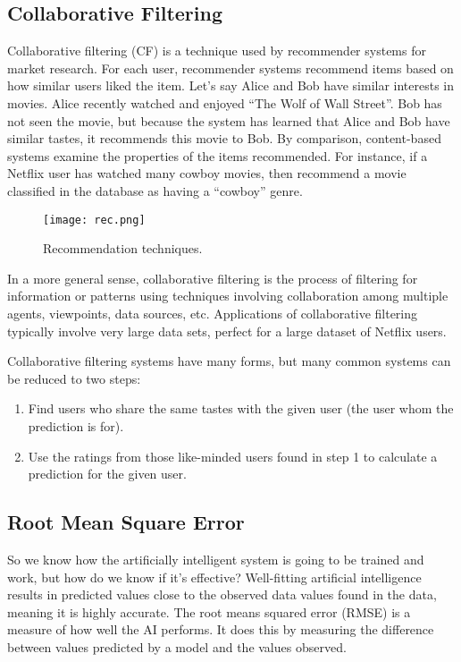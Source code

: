 \documentclass[12pt,a4paper]{article}
\begin{document}
\subsection{Collaborative Filtering}

Collaborative filtering (CF) is a technique used by recommender systems for market research. For each user, recommender systems recommend items based on how similar users liked the item. Let’s say Alice and Bob have similar interests in movies. Alice recently watched and enjoyed \enquote{The Wolf of Wall Street}. Bob has not seen the movie, but because the system has learned that Alice and Bob have similar tastes, it recommends this movie to Bob. By comparison, content-based systems examine the properties of the items recommended. For instance, if a Netflix user has watched many cowboy movies, then recommend a movie classified in the database as having a \enquote{cowboy} genre.

\begin{figure}[H]
	\centering
	\texttt{[image: rec.png]}
	\caption{Recommendation techniques.}
\end{figure}

In a more general sense, collaborative filtering is the process of filtering for information or patterns using techniques involving collaboration among multiple agents, viewpoints, data sources, etc. Applications of collaborative filtering typically involve very large data sets, perfect for a large dataset of Netflix users.

Collaborative filtering systems have many forms, but many common systems can be reduced to two steps:
\begin{enumerate}
	\item Find users who share the same tastes with the given user (the user whom the prediction is for).
	\item Use the ratings from those like-minded users found in step 1 to calculate a prediction for the given user.
\end{enumerate}

\subsection{Root Mean Square Error}

So we know how the artificially intelligent system is going to be trained and work, but how do we know if it's effective? Well-fitting artificial intelligence results in predicted values close to the observed data values found in the data, meaning it is highly accurate. The root means squared error (RMSE) is a measure of how well the AI performs. It does this by measuring the difference between values predicted by a model and the values observed.
\end{document}
